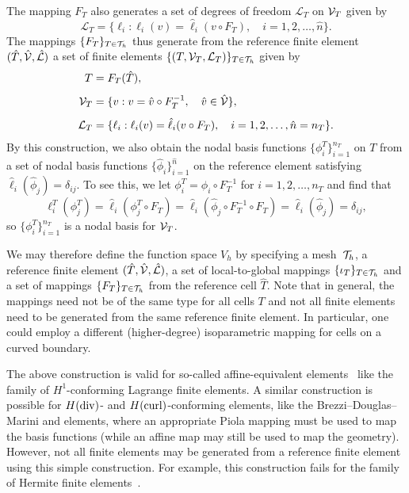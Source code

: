 The mapping $F_T$ also generates a set of degrees of freedom
$\mathcal{L}_T$ on $\mathcal{V}_T$ given by
\begin{equation}
  \mathcal{L}_T = \{ \ell_i : \ell_i(v) = \hat{\ell}_i(v \circ
  F_T), \quad i=1,2,\ldots,\hat{n} \}.
\end{equation}
The mappings $\{F_T\}_{T\in\mathcal{T}_h}$ thus generate from the reference
finite element~$(\hat{T},\hat{\mathcal{V}},\hat{\mathcal{L}})$ a set
of finite elements $\{(T,\mathcal{V}_T,\mathcal{L}_T)\}_{T\in\mathcal{T}_h}$
given by
\begin{equation} \label{eq:elementgeneration}
  \begin{split}
  T &= F_T(\hat{T}),
  \\[1ex]
  \mathcal{V}_T &= \{ v : v = \hat{v} \circ F_T^{-1}, \quad \hat{v} \in \hat{\mathcal{V}} \},
  \\[1ex]
  \mathcal{L}_T &= \{ \ell_i : \ell_i(v) = \hat{\ell}_i(v \circ F_T),
  \quad i=1,2,\ldots,\hat{n} = n_T \}.
  \end{split}
\end{equation}
By this construction, we also obtain the nodal basis functions
$\{\phi^T_i\}_{i=1}^{n_T}$ on $T$ from a set of nodal basis functions
$\{\hat{\phi}_i\}_{i=1}^{\hat{n}}$ on the reference element satisfying
$\hat{\ell}_i(\hat{\phi}_j) = \delta_{ij}$. To see this, we let
$\phi^T_i = \hat{\phi}_i \circ F_T^{-1}$ for $i=1,2,\ldots,n_T$ and
find that
\begin{equation}
  \ell^T_i(\phi^T_j)
  = \hat{\ell}_i(\phi^T_j \circ F_T)
  = \hat{\ell}_i(\hat{\phi}_j \circ F_T^{-1} \circ F_T)
  = \hat{\ell}_i(\hat{\phi}_j)
  = \delta_{ij},
\end{equation}
so $\{\phi^T_i\}_{i=1}^{n_T}$ is a nodal basis for $\mathcal{V}_T$.

We may therefore define the function space $V_h$ by specifying a
mesh~$\mathcal{T}_h$, a reference finite element $(\hat{T},
\hat{\mathcal{V}}, \hat{\mathcal{L}})$, a set of local-to-global
mappings $\{\iota_T\}_{T\in\mathcal{T}_h}$ and a set of mappings
$\{F_T\}_{T\in\mathcal{T}_h}$ from the reference cell $\hat{T}$. Note that in
general, the mappings need not be of the same type for all cells $T$
and not all finite elements need to be generated from the same
reference finite element. In particular, one could employ a different
(higher-degree) isoparametric mapping for cells on a curved boundary.

%
The above construction is valid for so-called affine-equivalent
elements~\citep{BrennerScott2008} like the family of $H^1$-conforming
Lagrange finite elements. A similar construction is possible for
$H(\mathrm{div})$- and $H(\mathrm{curl})$-conforming elements, like the
Brezzi--Douglas--Marini and \nedelec{} elements, where an appropriate
Piola mapping must be used to map the basis functions (while an affine
map may still be used to map the geometry). However, not all finite
elements may be generated from a reference finite element using this
simple construction. For example, this construction fails for the
family of Hermite finite
elements~\citep{Ciarlet2002,BrennerScott2008}.

